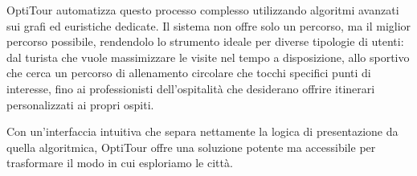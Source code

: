 OptiTour automatizza questo processo complesso utilizzando algoritmi avanzati sui grafi ed euristiche dedicate. Il sistema non offre solo un percorso, ma il miglior percorso possibile, rendendolo lo strumento ideale per diverse tipologie di utenti: dal turista che vuole massimizzare le visite nel tempo a disposizione, allo sportivo che cerca un percorso di allenamento circolare che tocchi specifici punti di interesse, fino ai professionisti dell'ospitalità che desiderano offrire itinerari personalizzati ai propri ospiti.

Con un'interfaccia intuitiva che separa nettamente la logica di presentazione da quella algoritmica, OptiTour offre una soluzione potente ma accessibile per trasformare il modo in cui esploriamo le città.